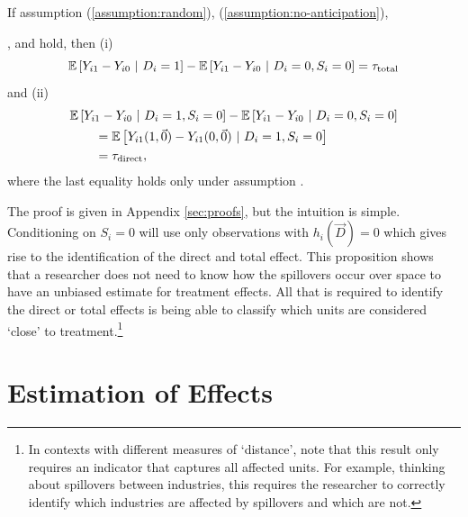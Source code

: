 \documentclass[11pt]{article}
\begin{document}
\begin{proposition}\label{thm:remove_bias}
    If assumption (\ref{assumption:random}), (\ref{assumption:no-anticipation}), 
    
    \noindent{}, and  hold, then (i) 
    \begin{equation}\label{eq:id_total}
        \mathbb{E}\left[Y_{i1} - Y_{i0} \ \vert \ D_i = 1\right] - \mathbb{E}\left[Y_{i1} - Y_{i0} \ \vert \ D_i = 0, S_{i} = 0\right] = \tau_{\text{total}}
    \end{equation}
    and (ii) 
    \begin{align}\begin{split}\label{eq:id_direct}
        &\mathbb{E}\left[Y_{i1} - Y_{i0} \ \vert \ D_i = 1, S_{i} = 0 \right] - \mathbb{E}\left[Y_{i1} - Y_{i0} \ \vert \ D_i = 0, S_{i} = 0 \right] \\
        &\quad\quad= \mathbb{E}\left[Y_{i1}(1, \vec{0}) - Y_{i1}(0, \vec{0}) \ \vert \ D_i = 1, S_i = 0\right]\\
        &\quad\quad= \tau_{\text{direct}},
    \end{split}\end{align}
    where the last equality holds only under assumption .
\end{proposition}

The proof is given in Appendix \ref{sec:proofs}, but the intuition is simple. Conditioning on $S_i = 0$ will use only observations with $h_i(\vec{D}) = 0$ which gives rise to the identification of the direct and total effect. 
This proposition shows that a researcher does not need to know how the spillovers occur over space to have an unbiased estimate for treatment effects. All that is required to identify the direct or total effects is being able to classify which units are considered `close' to treatment.\footnote{In contexts with different measures of `distance', note that this result only requires an indicator that captures all affected units. For example, thinking about spillovers between industries, this requires the researcher to correctly identify which industries are affected by spillovers and which are not.} 

\section{Estimation of Effects}\label{sec:estimation}
\end{document}
